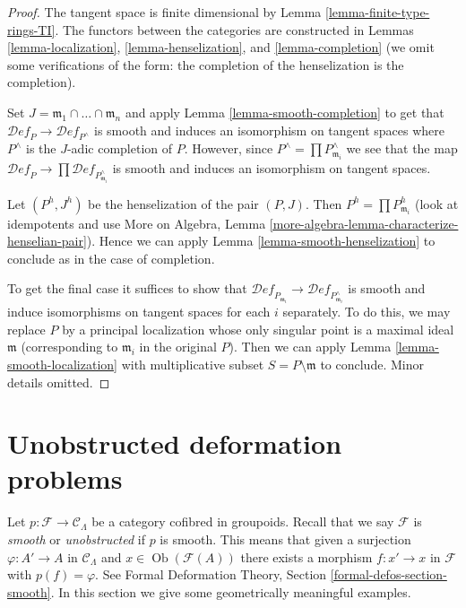 \documentclass{stacks-project}
\theoremstyle{plain}
\theoremstyle{definition}
\theoremstyle{remark}
\numberwithin{equation}{subsection}
\def\Ob{\mathop{\mathrm{Ob}}\nolimits}
\def\Deformationcategory{\mathcal{D}\!\mathit{ef}}
\begin{document}
\begin{proof}
The tangent space is finite dimensional by
Lemma \ref{lemma-finite-type-rings-TI}.
The functors between the categories are constructed
in Lemmas \ref{lemma-localization}, \ref{lemma-henselization}, and
\ref{lemma-completion} (we omit some verifications of the form:
the completion of the henselization is the completion).

\medskip\noindent
Set $J = \mathfrak m_1 \cap \ldots \cap \mathfrak m_n$ and apply
Lemma \ref{lemma-smooth-completion} to get that
$\Deformationcategory_P \to \Deformationcategory_{P^\wedge}$
is smooth and induces an isomorphism on tangent spaces
where $P^\wedge$ is the $J$-adic completion of $P$.
However, since $P^\wedge = \prod P_{\mathfrak m_i}^\wedge$
we see that the map $\Deformationcategory_P \to
\prod \Deformationcategory_{P_{\mathfrak m_i}^\wedge}$
is smooth and induces an isomorphism on tangent spaces.

\medskip\noindent
Let $(P^h, J^h)$ be the henselization of the pair $(P, J)$.
Then $P^h = \prod P_{\mathfrak m_i}^h$ (look at idempotents
and use More on Algebra, Lemma
\ref{more-algebra-lemma-characterize-henselian-pair}).
Hence we can apply Lemma \ref{lemma-smooth-henselization}
to conclude as in the case of completion.

\medskip\noindent
To get the final case it suffices to show that
$\Deformationcategory_{P_{\mathfrak m_i}} \to
\Deformationcategory_{P_{\mathfrak m_i}^\wedge}$
is smooth and induce isomorphisms on tangent spaces for each $i$ separately.
To do this, we may replace $P$ by a principal localization
whose only singular point is a maximal ideal $\mathfrak m$
(corresponding to $\mathfrak m_i$ in the original $P$).
Then we can apply
Lemma \ref{lemma-smooth-localization}
with multiplicative subset $S = P \setminus \mathfrak m$ to conclude.
Minor details omitted.
\end{proof}






\section{Unobstructed deformation problems}
\label{section-unobstructed}

\noindent
Let $p : \mathcal{F} \to \mathcal{C}_\Lambda$ be a
category cofibred in groupoids. Recall that we say $\mathcal{F}$
is {\it smooth} or {\it unobstructed} if $p$ is smooth.
This means that given a surjection $\varphi : A' \to A$ in
$\mathcal{C}_\Lambda$ and $x \in \Ob(\mathcal{F}(A))$
there exists a morphism $f : x' \to x$ in $\mathcal{F}$
with $p(f) = \varphi$.
See Formal Deformation Theory, Section \ref{formal-defos-section-smooth}.
In this section we give some geometrically meaningful examples.
\end{document}
